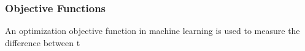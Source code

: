 \subsubsection{Objective Functions}
An optimization objective function in machine learning is used to measure the difference between t